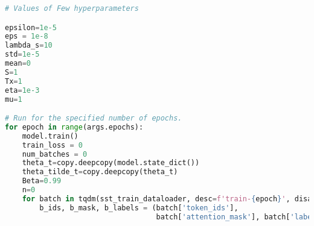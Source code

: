 \begin{lstlisting}[language=Python, caption={Sentiment Analysis Training with SMART}, label={lst:sst_SMART}, basicstyle=\ttfamily\small, keywordstyle=\color{blue}, commentstyle=\color{green}, stringstyle=\color{red},linewidth=\textwidth]
# Values of Few hyperparameters

epsilon=1e-5
eps = 1e-8
lambda_s=10
std=1e-5
mean=0
S=1
Tx=1
eta=1e-3
mu=1

# Run for the specified number of epochs.
for epoch in range(args.epochs):
    model.train()
    train_loss = 0
    num_batches = 0
    theta_t=copy.deepcopy(model.state_dict())
    theta_tilde_t=copy.deepcopy(theta_t)
    Beta=0.99
    n=0
    for batch in tqdm(sst_train_dataloader, desc=f'train-{epoch}', disable=TQDM_DISABLE):
        b_ids, b_mask, b_labels = (batch['token_ids'],
                                   batch['attention_mask'], batch['labels'])


\end{lstlisting}
